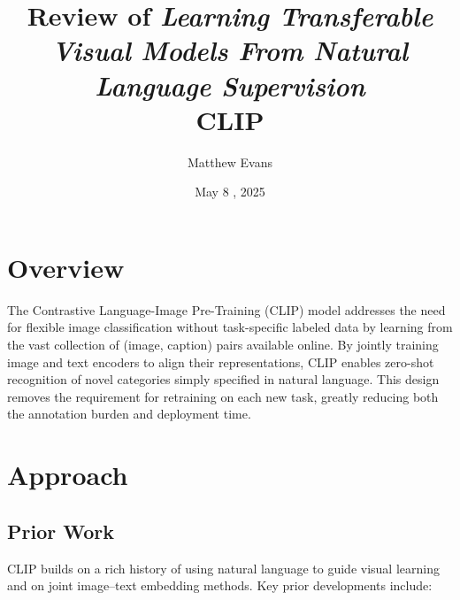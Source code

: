 \documentclass[10pt]{article}
\title{
    Review of \textit{Learning Transferable Visual Models From Natural Language Supervision}\\
    \small{CLIP}
}
\author{Matthew Evans}
\date{May 8 , 2025}
\begin{document}
\maketitle

\section*{Overview}
The Contrastive Language-Image Pre-Training (CLIP)\cite{DBLP:journals/corr/abs-2103-00020} model addresses the need for flexible image classification without task-specific labeled data by learning from the vast collection of (image, caption) pairs available online. By jointly training image and text encoders to align their representations, CLIP enables zero-shot recognition of novel categories simply specified in natural language. This design removes the requirement for retraining on each new task, greatly reducing both the annotation burden and deployment time.


\section*{Approach}
\subsection*{Prior Work}
CLIP builds on a rich history of using natural language to guide visual learning and on joint image–text embedding methods. Key prior developments include:
\end{document}
